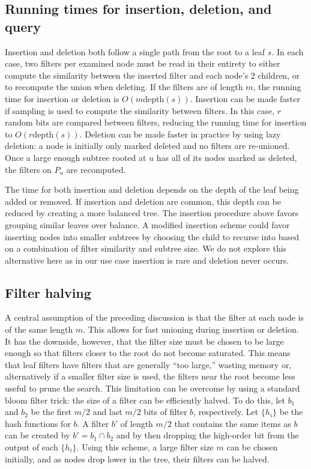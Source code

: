 \documentclass[11pt]{article}
\begin{document}
\subsection{Running times for insertion, deletion, and query}

Insertion and deletion both follow a single path from the root to a leaf $s$. In each case, two filters per examined node must be read in their entirety to either compute the similarity between the inserted filter and each node's 2 children, or to recompute the union when deleting. If the filters are of length $m$, the running time for insertion or deletion is $O(m\text{depth}(s))$.  Insertion can be made faster if sampling is used to compute the similarity between filters. In this case, $r$ random bits are compared between filters, reducing the running time for insertion to $O(r\text{depth}(s))$. Deletion can be made faster in practice by using lazy deletion: a node is initially only marked deleted and no filters are re-unioned. Once a large enough subtree rooted at $u$ has all of its nodes marked as deleted, the filters on $P_u$ are recomputed. 

The time for both insertion and deletion depends on the depth of the leaf being added or removed. If insertion and deletion are common, this depth can be reduced by creating a more balanced tree. The insertion procedure above favors grouping similar leaves over balance. A modified insertion scheme could favor inserting nodes into smaller subtrees by choosing the child to recurse into based on a combination of filter similarity and subtree size. We do not explore this alternative here as in our use case insertion is rare and deletion never occurs.

\subsection{Filter halving}

A central assumption of the preceding discussion is that the filter at each node is of the same length $m$. This allows for fast unioning during insertion or deletion. It has the downside, however, that the filter size must be chosen to be large enough so that filters closer to the root do not become saturated. This means that leaf filters have filters that are generally ``too large,'' wasting memory or, alternatively if a smaller filter size is used, the filters near the root become less useful to prune the search. This limitation can be overcome by using a standard bloom filter trick: the size of a filter can be efficiently halved. To do this, let $b_1$ and $b_2$ be the first $m/2$ and last $m/2$ bits of filter $b$, respectively.  Let $\{h_i\}$ be the hash functions for $b$. A filter $b'$ of length $m/2$ that contains the same items as $b$ can be created by $b' = b_1 \cap b_2$ and by then dropping the high-order bit from the output of each $\{h_i\}$.  Using this scheme, a large filter size $m$ can be chosen initially, and as nodes drop lower in the tree, their filters can be halved. 
\end{document}
